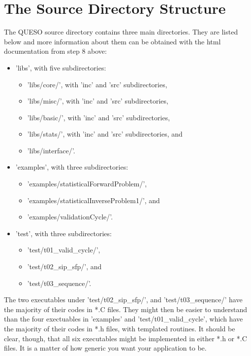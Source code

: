 \section{The Source Directory Structure} \label{sc-source-dir-structure}

The QUESO source directory contains three main directories. They are listed below and more
information about them can be obtained with the html documentation from step 8 above:
\begin{itemize}
\item {'libs', with five subdirectories:
\begin{itemize}
\item 'libs/core/', with 'inc' and 'src' subdirectories,
\item 'libs/misc/', with 'inc' and 'src' subdirectories,
\item 'libs/basic/', with 'inc' and 'src' subdirectories,
\item 'libs/stats/', with 'inc' and 'src' subdirectories, and
\item 'libs/interface/'.
\end{itemize}
}
\item {'examples', with three subdirectories:
\begin{itemize}
\item 'examples/statisticalForwardProblem/',
\item 'examples/statisticalInverseProblem1/', and
\item 'examples/validationCycle/'.
\end{itemize}
}
\item {'test', with three subdirectories:
\begin{itemize}
\item 'test/t01\_valid\_cycle/',
\item 'test/t02\_sip\_sfp/', and
\item 'test/t03\_sequence/'.
\end{itemize}
}
\end{itemize}

The two executables under 'test/t02\_sip\_sfp/', and 'test/t03\_sequence/'
have the majority of their codes in *.C files.
They might then be easier to understand than
the four exectuables in 'examples' and 'test/t01\_valid\_cycle', which
have the majority of their codes in *.h files, with templated routines.
It should be clear, though, that all six executables might be implemented in either *.h or *.C files.
It is a matter of how generic you want your application to be.

